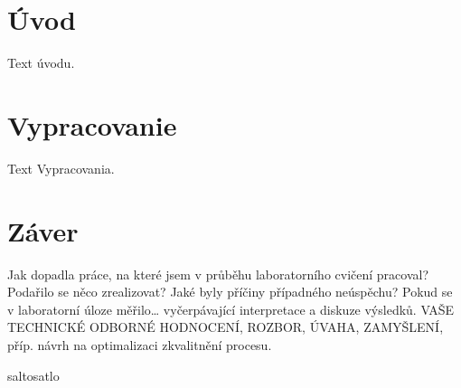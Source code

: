 \documentclass[12pt]{article}
\begin{document}



\tableofcontents

\cleardoublepage{}
\section*{Úvod}
Text úvodu.

\section{Vypracovanie}
Text Vypracovania.

\cleardoublepage{}
\section*{Záver}
Jak dopadla práce, na které jsem v průběhu laboratorního cvičení pracoval? Podařilo se něco zrealizovat? Jaké byly příčiny případného neúspěchu? Pokud se v laboratorní úloze měřilo… vyčerpávající interpretace a diskuze výsledků. VAŠE TECHNICKÉ ODBORNÉ HODNOCENÍ, ROZBOR, ÚVAHA, ZAMYŠLENÍ, příp. návrh na optimalizaci zkvalitnění procesu.

salto\cite{thick_film}satlo\cite{modeling_em}\cite*{leds_magazine}

\cleardoublepage{}
\printbibliography[title=Literatúra]
\end{document}

